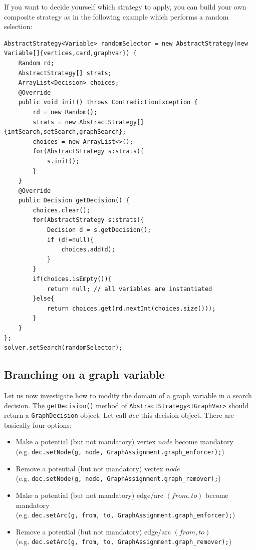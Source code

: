 \documentclass{article}
\begin{document}
If you want to decide yourself which strategy to apply, you can build your own composite strategy as in the following example which performs a random selection:

\begin{lstlisting}
AbstractStrategy<Variable> randomSelector = new AbstractStrategy(new Variable[]{vertices,card,graphvar}) {
	Random rd;
	AbstractStrategy[] strats;
	ArrayList<Decision> choices;
	@Override
	public void init() throws ContradictionException {
		rd = new Random();
		strats = new AbstractStrategy[]{intSearch,setSearch,graphSearch};
		choices = new ArrayList<>();
		for(AbstractStrategy s:strats){
			s.init();
		}
	}
	@Override
	public Decision getDecision() {
		choices.clear();
		for(AbstractStrategy s:strats){
			Decision d = s.getDecision();
			if (d!=null){
				choices.add(d);
			}
		}
		if(choices.isEmpty()){
			return null; // all variables are instantiated
		}else{
			return choices.get(rd.nextInt(choices.size()));
		}
	}
};
solver.setSearch(randomSelector);
\end{lstlisting}

\subsection{Branching on a graph variable}

Let us now investigate how to modify the domain of a graph variable in a search decision. 
The \texttt{getDecision()} method of \texttt{AbstractStrategy<IGraphVar>} should return a \texttt{GraphDecision} object. Let call $dec$ this decision object. 
There are basically four options:
\begin{itemize} 
\item Make a potential (but not mandatory) vertex $node$ become mandatory \\ 
(e.g. \texttt{dec.setNode(g, node, GraphAssignment.graph\_enforcer);})
\item Remove a potential (but not mandatory) vertex $node$ \\ 
(e.g. \texttt{dec.setNode(g, node, GraphAssignment.graph\_remover);})
\item Make a potential (but not mandatory) edge/arc $(from,to)$ become mandatory \\ 
(e.g. \texttt{dec.setArc(g, from, to, GraphAssignment.graph\_enforcer);})
\item Remove a potential (but not mandatory) edge/arc $(from,to)$ \\ 
(e.g. \texttt{dec.setArc(g, from, to, GraphAssignment.graph\_remover);})
\end{itemize}
\end{document}
